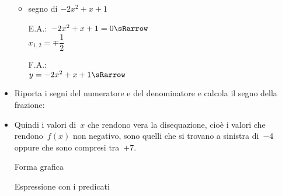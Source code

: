 \begin{esempio}
\begin{itemize}
\begin{itemize}
 \item segno di \(-2x^2 +x +1\)\\
 \begin{minipage}{.35\textwidth}
  E.A.:~\(-2x^2 +x +1=0 \sRarrow \) \\
  \(x_{1,2}=\mp\dfrac{1}{2}\)
 \end{minipage}
 \begin{minipage}{.25\textwidth}
  F.A.:\\
  \(y=-2x^2 +x +1 \sRarrow\)
 \end{minipage}
 \begin{minipage}{.38\textwidth}
  \begin{inaccessibleblock}
  \parabolaamidma{}{}
\end{inaccessibleblock}
 \end{minipage}

\end{itemize}

 \item Riporta i segni del numeratore e del denominatore e calcola
il segno della frazione:

\begin{inaccessibleblock}
\vspace{2em}
  \begin{center}
  \segnofrazionec
  \end{center}
\end{inaccessibleblock}

 \item Quindi i valori di~\(x\) che rendono vera la disequazione, cioè i
valori
  che rendono~\(f(x)\) non negativo, sono quelli
  che si trovano a sinistra di~\(-4\) oppure che sono compresi
  tra~\(+7\).\\

  \begin{minipage}{.32\textwidth}
  \vspace{.7em}
  Forma grafica\\ [-.8em]

\begin{inaccessibleblock}
  \begin{center}
  \end{center}
\end{inaccessibleblock}
\vspace{.1em}

  \end{minipage}
  \begin{minipage}{.32\textwidth}
  Espressione con i predicati\\[-.3em]


\end{minipage}
\end{itemize}
\end{esempio}
